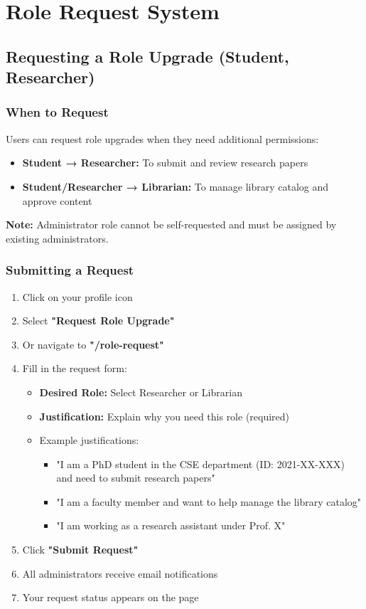 \documentclass[12pt,a4paper]{article}
\begin{document}
\section{Role Request System}

\subsection{Requesting a Role Upgrade (Student, Researcher)}

\subsubsection{When to Request}
Users can request role upgrades when they need additional permissions:
\begin{itemize}[leftmargin=*]
    \item \textbf{Student → Researcher:} To submit and review research papers
    \item \textbf{Student/Researcher → Librarian:} To manage library catalog and approve content
\end{itemize}

\textbf{Note:} Administrator role cannot be self-requested and must be assigned by existing administrators.

\subsubsection{Submitting a Request}
\begin{enumerate}[leftmargin=*]
    \item Click on your profile icon
    \item Select \textbf{"Request Role Upgrade"}
    \item Or navigate to \textbf{"/role-request"}
    \item Fill in the request form:
        \begin{itemize}
            \item \textbf{Desired Role:} Select Researcher or Librarian
            \item \textbf{Justification:} Explain why you need this role (required)
            \item Example justifications:
                \begin{itemize}
                    \item "I am a PhD student in the CSE department (ID: 2021-XX-XXX) and need to submit research papers"
                    \item "I am a faculty member and want to help manage the library catalog"
                    \item "I am working as a research assistant under Prof. X"
                \end{itemize}
        \end{itemize}
    \item Click \textbf{"Submit Request"}
    \item All administrators receive email notifications
    \item Your request status appears on the page
\end{enumerate}
\end{document}
